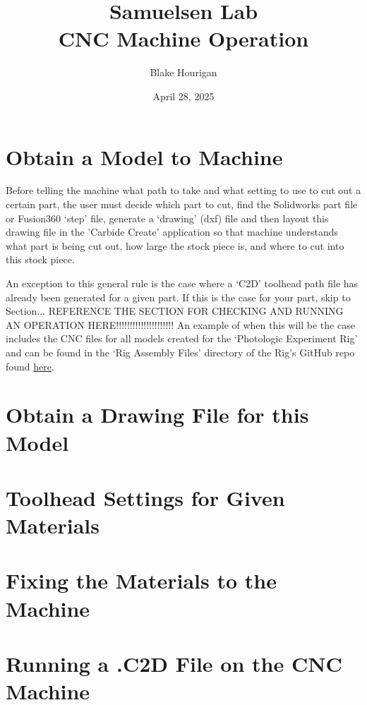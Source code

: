 \documentclass{article}
\title{Samuelsen Lab \\ CNC Machine Operation}
\author{Blake Hourigan}
\date{April 28, 2025}
\begin{document}
\maketitle
\clearpage
\tableofcontents
\clearpage


\section{Obtain a Model to Machine}
Before telling the machine what path to take and what setting to use to cut out a certain part, the user must decide which part to cut, find the Solidworks part file or Fusion360 `step' file, 
generate a `drawing' (dxf) file and then layout this drawing file in the 'Carbide Create' application so that machine understands what part is being cut out, how large the stock piece is, 
and where to cut into this stock piece. 

An exception to this general rule is the case where a `C2D' toolhead path file has already been generated for a given part. If this is the case for your part, skip to Section... REFERENCE 
THE SECTION FOR CHECKING AND RUNNING AN OPERATION HERE!!!!!!!!!!!!!!!!!!!!! An example of when this will be the case includes the CNC files for all models created for the `Photologic 
Experiment Rig' and can be found in the `Rig Assembly Files' directory of the Rig's GitHub repo found \href{https://github.com/blakehourigan/Photologic-Experiment-Rig}{here}.


\section{Obtain a Drawing File for this Model}

\section{Toolhead Settings for Given Materials}

\section{Fixing the Materials to the Machine}
\section{Running a .C2D File on the CNC Machine}
\end{document}

